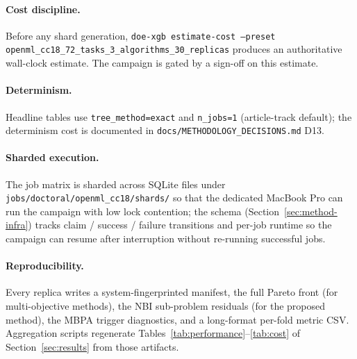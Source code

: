 \paragraph{Cost discipline.} Before any shard generation,
\texttt{doe-xgb estimate-cost --preset
openml\_cc18\_72\_tasks\_3\_algorithms\_30\_replicas} produces an
authoritative wall-clock estimate. The campaign is gated by a
sign-off on this estimate.

\paragraph{Determinism.} Headline tables use
\texttt{tree\_method=exact} and \texttt{n\_jobs=1} (article-track
default); the determinism cost is documented in
\texttt{docs/METHODOLOGY\_DECISIONS.md} D13.

\paragraph{Sharded execution.} The job matrix is sharded across
SQLite files under \texttt{jobs/doctoral/openml\_cc18/shards/} so
that the dedicated MacBook Pro can run the campaign with low lock
contention; the schema (Section~\ref{sec:method-infra}) tracks
claim / success / failure transitions and per-job runtime so the
campaign can resume after interruption without re-running successful
jobs.

\paragraph{Reproducibility.} Every replica writes a
system-fingerprinted manifest, the full Pareto front (for
multi-objective methods), the NBI sub-problem residuals
(for the proposed method), the MBPA trigger diagnostics, and a
long-format per-fold metric CSV. Aggregation scripts regenerate
Tables~\ref{tab:performance}--\ref{tab:cost} of
Section~\ref{sec:results} from those artifacts.
